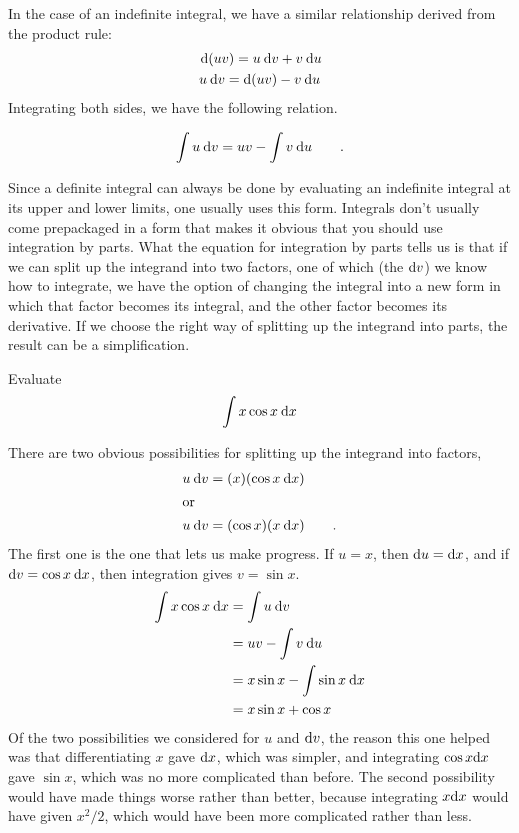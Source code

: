 In the case of an indefinite integral, we have a similar relationship
derived from the product rule:
\begin{gather*}
  \:\textup{d}(uv) = u \:\textup{d} v + v \:\textup{d} u \\
  u \:\textup{d} v = \textup{d}(uv) - v \:\textup{d} u 
\end{gather*}
Integrating both sides, we have the following relation.
\begin{important}
\begin{equation*}
  \int u \:\textup{d} v = uv - \int v \:\textup{d} u \qquad .
\end{equation*}
\end{important}
Since a definite integral can always be done by evaluating an indefinite
integral at its upper and lower limits, one usually uses this form.
Integrals don't usually come prepackaged in a form that makes it
obvious that you should use integration by parts. What the equation for
integration by parts tells us is that if we can split up the integrand
into two factors, one of which (the $\textup{d} v$) we know how to integrate, we have
the option of changing the integral into a new form in which that factor
becomes its integral, and the other factor becomes its derivative. If we
choose the right way of splitting up the integrand into parts, the result can be
a simplification.

\begin{eg}
\egquestion Evaluate
\begin{equation*}
  \int x \cos x \:\textup{d} x
\end{equation*}

\egquestion There are two obvious possibilities for splitting up the integrand
into factors,
\begin{align*}
  u \:\textup{d} v &= (x)(\cos x\:\textup{d} x) \\
\intertext{or}
  u \:\textup{d} v &= (\cos x)(x\:\textup{d} x) \qquad .
\end{align*}
The first one is the one that lets us make progress. If $u=x$, then
$\textup{d} u=\textup{d} x$, and if $\textup{d} v=\cos x\:\textup{d} x$, then integration
gives $v=\sin x$.
\begin{align*}
  \int x \cos x \:\textup{d} x &= \int u \:\textup{d} v \\
                       &= uv - \int v \:\textup{d} u \\
                       &= x\sin x-\int \sin x \:\textup{d} x \\
                       &= x\sin x+\cos x
\end{align*}
Of the two possibilities we considered for $u$ and $\textup{d} v$, the reason
this one helped was that differentiating $x$ gave $\textup{d} x$, which was
simpler, and integrating $\cos x\textup{d} x$ gave $\sin x$, which was no
more complicated than before. The second possibility would have made
things worse rather than better, because integrating $x\textup{d} x$ would
have given $x^2/2$, which would have been more complicated rather than
less.
\end{eg}

